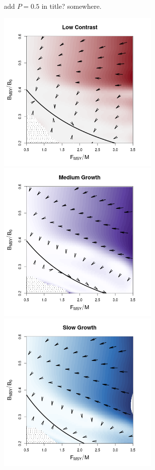 \documentclass[a0paper,portrait]{baposter}
\begin{document}
\begin{poster}
{	{\color{red}add $P=0.5$ in title? somewhere.}\\
        \begin{minipage}[h!]{0.25\textwidth}
	\includegraphics[width=0.6\textwidth]{../../ddBias/directionalBiasDDSubFlatT45N150A0-1AS0.1K10N56Reds 2.png}\\
        \includegraphics[width=0.6\textwidth]{../../ddBias/directionalBiasDDSubFlatT45N150A0-1AS1K0.5N56Purples.png}\\
        \includegraphics[width=0.6\textwidth]{../../ddBias/directionalBiasDDSubFlatT45N150A0-1AS2K0.1N84EdgeBlues.png}

\end{minipage}}
\end{poster}
\end{document}
